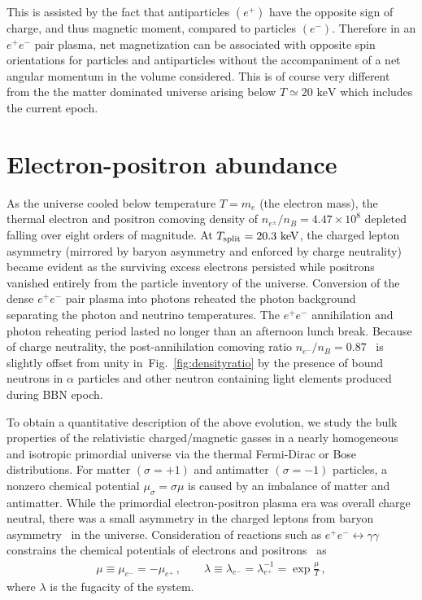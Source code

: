 \documentclass[reprint]{revtex4-2}
\newcommand*{\keV}{\text{ keV}}
\newcommand{\rf}[1]{Fig.~{\ref{#1}}}
\newcommand*{\xblue}{\color{black}}
\begin{document}
This is assisted by the fact that antiparticles $(e^{+})$ have the opposite sign of charge, and thus magnetic moment, compared to particles  $(e^{-})$. {\xblue Therefore in an $e^{+}e^{-}$ pair plasma, net magnetization can be associated with opposite spin orientations for particles and antiparticles without the accompaniment of} a net angular momentum in the volume considered. This is of course very different from the the matter dominated universe arising below $T\simeq20\keV$ which includes the current epoch.

\section{Electron-positron abundance}
\label{sec:abundance}
\noindent As the universe cooled below temperature $T=m_{e}$ (the electron mass), the thermal electron and positron comoving density {\xblue of $n_{e^{\pm}}/n_{B}=4.47\times10^{8}$} depleted falling over eight orders of magnitude. At $T_{\rm split}=20.3\keV$, the charged lepton asymmetry (mirrored by baryon asymmetry {\xblue and enforced by charge neutrality}) became evident {\xblue as the surviving excess electrons persisted while positrons vanished entirely from the particle inventory of the universe. Conversion of the dense $e^{+}e^{-}$ pair plasma into photons reheated the photon background~\cite{birrell2014relic} separating the photon and neutrino temperatures. The $e^{+}e^{-}$ annihilation and photon reheating period lasted no longer than an afternoon lunch break.} Because of charge neutrality, the post-annihilation comoving ratio $n_{e^{-}}/n_{B}=0.87$~\cite{rafelski2023short} is slightly offset from unity in~\rf{fig:densityratio} by the presence of bound neutrons in $\alpha$ particles and  other neutron containing light elements produced during BBN epoch. 

{\xblue To obtain a quantitative description of the above evolution, we study the bulk properties of the relativistic charged/magnetic gasses in a nearly homogeneous and isotropic primordial universe via} the thermal Fermi-Dirac or Bose distributions. {\xblue For matter $(\sigma=+1)$ and antimatter $(\sigma=-1)$ particles, a nonzero chemical potential $\mu_{\sigma}=\sigma\mu$ is caused by an imbalance of matter and antimatter. While the primordial electron-positron plasma era was overall charge neutral, there was a small asymmetry in the charged leptons from baryon asymmetry~\cite{fromerth2012quarkgluon,canetti2012matter} in the universe. Consideration of reactions such as $e^+e^-\leftrightarrow\gamma\gamma$ constrains the chemical potentials of electrons and positrons~\cite{elze1980relativistic} as 
\begin{align}
    \label{cpotential}
    \mu\equiv\mu_{e^{-}}=-\mu_{e^{+}}\,,\qquad
    \lambda\equiv\lambda_{e^{-}}=\lambda_{e^{+}}^{-1}=\exp\frac{\mu}{T}\,,
\end{align}
where $\lambda$ is the fugacity of the system.} 
\end{document}

